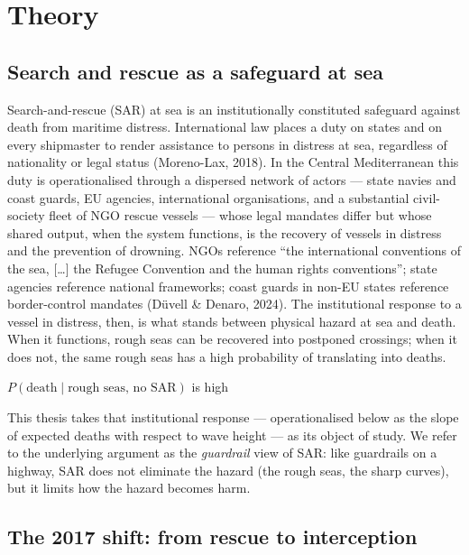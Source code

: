 \documentclass[
  11pt,
  a4paper,
]{article}
\begin{document}
\section{Theory}\label{theory}

\subsection{Search and rescue as a safeguard at
sea}\label{search-and-rescue-as-a-safeguard-at-sea}

Search-and-rescue (SAR) at sea is an institutionally constituted
safeguard against death from maritime distress. International law places
a duty on states and on every shipmaster to render assistance to persons
in distress at sea, regardless of nationality or legal status
(Moreno-Lax, 2018). In the Central Mediterranean this duty is
operationalised through a dispersed network of actors --- state navies
and coast guards, EU agencies, international organisations, and a
substantial civil-society fleet of NGO rescue vessels --- whose legal
mandates differ but whose shared output, when the system functions, is
the recovery of vessels in distress and the prevention of drowning. NGOs
reference ``the international conventions of the sea, {[}\ldots{]} the
Refugee Convention and the human rights conventions''; state agencies
reference national frameworks; coast guards in non-EU states reference
border-control mandates (Düvell \& Denaro, 2024). The institutional
response to a vessel in distress, then, is what stands between physical
hazard at sea and death. When it functions, rough seas can be recovered
into postponed crossings; when it does not, the same rough seas has a
high probability of translating into deaths.

\(P(\text{death} \mid \text{rough seas, no SAR})\) is high

This thesis takes that institutional response --- operationalised below
as the slope of expected deaths with respect to wave height --- as its
object of study. We refer to the underlying argument as the
\emph{guardrail} view of SAR: like guardrails on a highway, SAR does not
eliminate the hazard (the rough seas, the sharp curves), but it limits
how the hazard becomes harm.

\subsection{The 2017 shift: from rescue to
interception}\label{the-2017-shift-from-rescue-to-interception}
\end{document}
